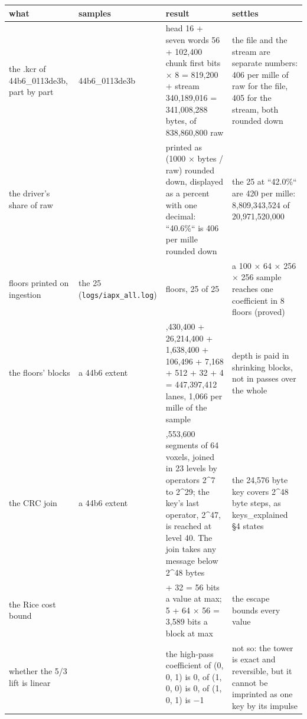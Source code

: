 {\footnotesize
\setlength{\tabcolsep}{6pt}
\begin{longtable}{>{\RaggedRight\arraybackslash}p{}>{\RaggedRight\arraybackslash}p{}>{\RaggedRight\arraybackslash}p{}>{\RaggedRight\arraybackslash}p{}}
\toprule
what & samples & result & settles \\
\midrule
\endhead
the .kcr of 44b6\_\allowbreak{}0113de3b, part by part & 44b6\_\allowbreak{}0113de3b & head 16 + seven words 56 + 102,400 chunk first bits × 8 = 819,200 + stream 340,189,016 = 341,008,288 bytes, of 838,860,800 raw & the file and the stream are separate numbers: 406 per mille of raw for the file, 405 for the stream, both rounded down \\
the driver's share of raw &  & printed as (1000 × bytes / raw) rounded down, displayed as a percent with one decimal: “40.6\%“ is 406 per mille rounded down & the 25 at “42.0\%“ are 420 per mille: 8,809,343,524 of 20,971,520,000 \\
floors printed on ingestion & the 25 (\texttt{logs/\allowbreak{}iapx\_\allowbreak{}all.\allowbreak{}log}) & 8 floors, 25 of 25 & a 100 × 64 × 256 × 256 sample reaches one coefficient in 8 floors (proved) \\
the floors' blocks & a 44b6 extent & 419,430,400 + 26,214,400 + 1,638,400 + 106,496 + 7,168 + 512 + 32 + 4 = 447,397,412 lanes, 1,066 per mille of the sample & depth is paid in shrinking blocks, not in passes over the whole \\
the CRC join & a 44b6 extent & 6,553,600 segments of 64 voxels, joined in 23 levels by operators 2\textasciicircum{}7 to 2\textasciicircum{}29; the key's last operator, 2\textasciicircum{}47, is reached at level 40. The join takes any message below 2\textasciicircum{}48 bytes & the 24,576 byte key covers 2\textasciicircum{}48 byte steps, as keys\_\allowbreak{}explained §4 states \\
the Rice cost bound &  & 24 + 32 = 56 bits a value at max; 5 + 64 × 56 = 3,589 bits a block at max & the escape bounds every value \\
whether the 5/3 lift is linear &  & the high-pass coefficient of (0, 0, 1) is 0, of (1, 0, 0) is 0, of (1, 0, 1) is −1 & not so: the tower is exact and reversible, but it cannot be imprinted as one key by its impulse \\
\bottomrule
\end{longtable}
}

